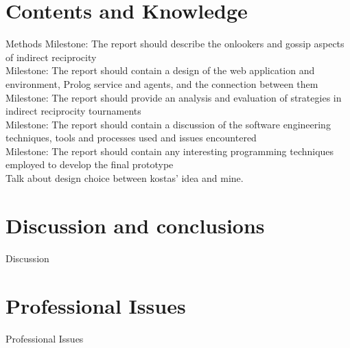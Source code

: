 \chapter{Contents and Knowledge}
Methods
Milestone: The report should describe the onlookers and gossip aspects of indirect reciprocity\\
Milestone: The report should contain a design of the web application and environment, Prolog service and agents, and the connection between them\\
Milestone: The report should provide an analysis and evaluation of strategies in indirect reciprocity tournaments\\
Milestone: The report should contain a discussion of the software engineering techniques, tools and processes used and issues encountered\\
Milestone: The report should contain any interesting programming techniques employed to develop the final prototype\\
Talk about design choice between kostas' idea and mine.


\chapter{Discussion and conclusions}
Discussion

{}


\chapter*{Professional Issues}
Professional Issues



